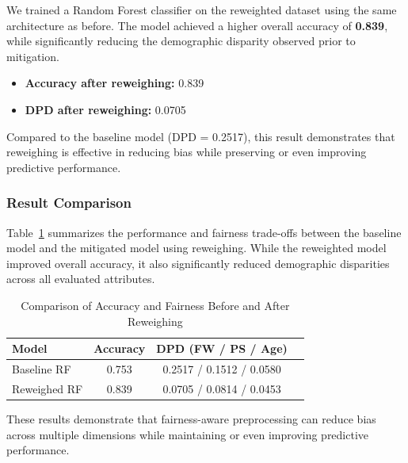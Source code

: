We trained a Random Forest classifier on the reweighted dataset using the same architecture as before. The model achieved a higher overall accuracy of \textbf{0.839}, while significantly reducing the demographic disparity observed prior to mitigation.

\begin{itemize}
    \item \textbf{Accuracy after reweighing:} 0.839
    \item \textbf{DPD after reweighing:} 0.0705
\end{itemize}

Compared to the baseline model (DPD = 0.2517), this result demonstrates that reweighing is effective in reducing bias while preserving or even improving predictive performance.


\subsubsection{Result Comparison}
Table~\ref{tab:comparison} summarizes the performance and fairness trade-offs between the baseline model and the mitigated model using reweighing. While the reweighted model improved overall accuracy, it also significantly reduced demographic disparities across all evaluated attributes.

\begin{table}[h]
\centering
\caption{Comparison of Accuracy and Fairness Before and After Reweighing}
\label{tab:comparison}
\begin{tabular}{lccc}
\toprule
\textbf{Model} & \textbf{Accuracy} & \textbf{DPD (FW / PS / Age)} \\
\midrule
Baseline RF & 0.753 & 0.2517 / 0.1512 / 0.0580 \\
Reweighed RF & 0.839 & 0.0705 / 0.0814 / 0.0453 \\
\bottomrule
\end{tabular}
\end{table}

These results demonstrate that fairness-aware preprocessing can reduce bias across multiple dimensions while maintaining or even improving predictive performance.





